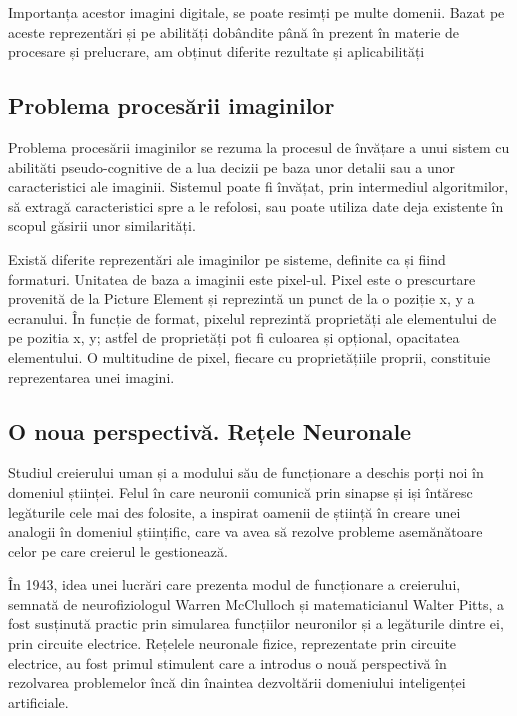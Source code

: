 	Importanța acestor imagini digitale, se poate resimți pe multe domenii. Bazat pe aceste reprezentări și pe abilități dobândite până în prezent în materie de procesare și prelucrare, am obținut diferite rezultate și aplicabilități
	
	\subsection{Problema procesării imaginilor}
	Problema procesării imaginilor se rezuma la procesul de învățare a unui sistem cu abilităti pseudo-cognitive de a lua decizii pe baza unor detalii sau a unor caracteristici ale imaginii. Sistemul poate fi învățat, prin intermediul algoritmilor, să extragă caracteristici spre a le refolosi, sau poate utiliza date deja existente în scopul găsirii unor similarități. 
	
	Există diferite reprezentări ale imaginilor pe sisteme, definite ca și fiind formaturi. Unitatea de baza a imaginii este pixel-ul. Pixel este o prescurtare provenită de la Picture Element și reprezintă un punct de la o poziție x, y a ecranului. În funcție de format, pixelul reprezintă proprietăți ale elementului de pe pozitia x, y; astfel de proprietăți pot fi culoarea și opțional, opacitatea elementului. O multitudine de pixel, fiecare cu proprietățiile proprii, constituie reprezentarea unei imagini. \cite{image_representation}
	
	\subsection{O noua perspectivă. Rețele Neuronale}
	Studiul creierului uman și a modului său de funcționare a deschis porți noi în domeniul științei. Felul în care neuronii comunică prin sinapse și iși întăresc legăturile cele mai des folosite, a inspirat oamenii de știință în creare unei analogii în domeniul științific, care va avea să rezolve probleme asemănătoare celor pe care creierul le gestionează.
	
	În 1943, idea unei  lucrări care prezenta modul de funcționare a creierului, semnată de  neurofiziologul Warren McClulloch și matematicianul Walter Pitts,  a fost susținută practic prin simularea funcțiilor neuronilor și a legăturile dintre ei, prin circuite electrice. Rețelele neuronale fizice, reprezentate prin circuite electrice, au fost primul stimulent care a introdus o nouă perspectivă în rezolvarea problemelor încă din înaintea dezvoltării domeniului inteligenței artificiale. 
	
